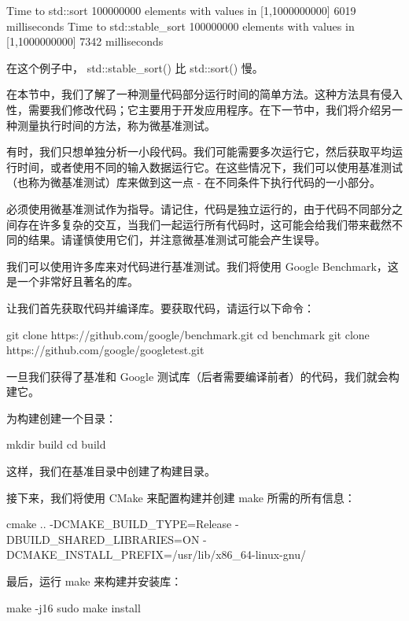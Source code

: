 \begin{shell}
Time to std::sort 100000000 elements with values in [1,1000000000]
6019 milliseconds
Time to std::stable_sort 100000000 elements with values in
[1,1000000000] 7342 milliseconds
\end{shell}

在这个例子中， std::stable\_sort() 比 std::sort() 慢。

在本节中，我们了解了一种测量代码部分运行时间的简单方法。这种方法具有侵入性，需要我们修改代码；它主要用于开发应用程序。在下一节中，我们将介绍另一种测量执行时间的方法，称为微基准测试。


有时，我们只想单独分析一小段代码。我们可能需要多次运行它，然后获取平均运行时间，或者使用不同的输入数据运行它。在这些情况下，我们可以使用基准测试（也称为微基准测试）库来做到这一点 - 在不同条件下执行代码的一小部分。

必须使用微基准测试作为指导。请记住，代码是独立运行的，由于代码不同部分之间存在许多复杂的交互，当我们一起运行所有代码时，这可能会给我们带来截然不同的结果。请谨慎使用它们，并注意微基准测试可能会产生误导。

我们可以使用许多库来对代码进行基准测试。我们将使用 Google Benchmark，这是一个非常好且著名的库。

让我们首先获取代码并编译库。要获取代码，请运行以下命令：

\begin{shell}
git clone https://github.com/google/benchmark.git
cd benchmark
git clone https://github.com/google/googletest.git
\end{shell}

一旦我们获得了基准和 Google 测试库（后者需要编译前者）的代码，我们就会构建它。

为构建创建一个目录：

\begin{shell}
mkdir build
cd build
\end{shell}

这样，我们在基准目录中创建了构建目录。

接下来，我们将使用 CMake 来配置构建并创建 make 所需的所有信息：

\begin{shell}
cmake .. -DCMAKE_BUILD_TYPE=Release -DBUILD_SHARED_LIBRARIES=ON -DCMAKE_INSTALL_PREFIX=/usr/lib/x86_64-linux-gnu/
\end{shell}

最后，运行 make 来构建并安装库：

\begin{shell}
make -j16
sudo make install
\end{shell}

